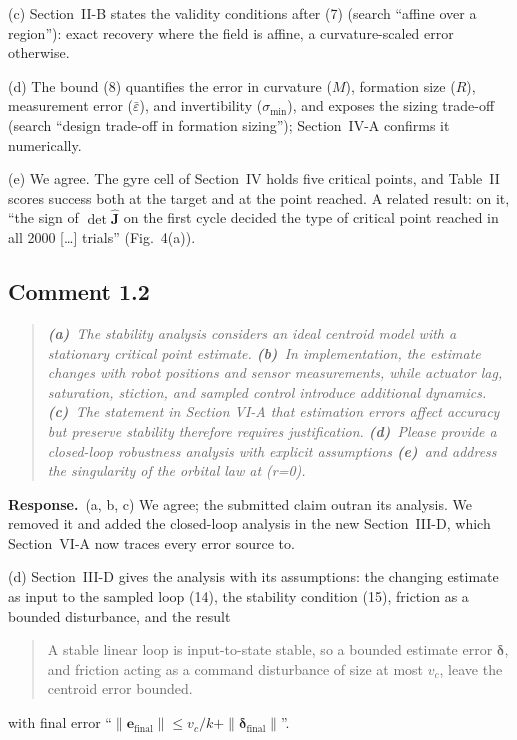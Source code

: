 \documentclass[10pt]{article}
\newcommand{\rev}[1]{#1}                             %
\newcommand{\resp}{\par\textbf{Response.}~}
\newenvironment{newtext}{\begin{quote}\small\sloppy}{\end{quote}}
\begin{document}
(c) Section~II-B states the validity conditions after (7) (search ``affine over a region''): exact recovery where the field is affine, a curvature-scaled error otherwise.

(d) The bound (8) quantifies the error in curvature ($M$), formation size ($R$), measurement error ($\bar\varepsilon$), and invertibility ($\sigma_{\min}$), and exposes the sizing trade-off (search ``design trade-off in formation sizing''); Section~IV-A confirms it numerically.

(e) We agree. The gyre cell of Section~IV holds five critical points, and Table~II scores success both at the target and at the point reached. A related result: on it, ``the sign of $\det\hat{\mathbf{J}}$ on the first cycle decided the type of critical point reached in all \rev{2000} [\ldots] trials'' (Fig.~4(a)).

\subsection*{Comment 1.2}

\begin{quote}\itshape
\textbf{(a)}~The stability analysis considers an ideal centroid model with a stationary critical point estimate.
\textbf{(b)}~In implementation, the estimate changes with robot positions and sensor measurements, while actuator lag, saturation, stiction, and sampled control introduce additional dynamics.
\textbf{(c)}~The statement in Section VI-A that estimation errors affect accuracy but preserve stability therefore requires justification.
\textbf{(d)}~Please provide a closed-loop robustness analysis with explicit assumptions
\textbf{(e)}~and address the singularity of the orbital law at (r=0).
\end{quote}

\resp (a, b, c) We agree; the submitted claim outran its analysis. We removed it and added the closed-loop analysis in the new Section~III-D, which Section~VI-A now traces every error source to.

(d) Section~III-D gives the analysis with its assumptions: the changing estimate as input to the sampled loop (14), the stability condition (15), friction as a bounded disturbance, and the result
\begin{newtext}
A stable linear loop is input-to-state stable, so a bounded estimate error $\boldsymbol{\delta}$, and friction acting as a command disturbance of size at most $v_c$, leave the centroid error bounded.
\end{newtext}
with final error ``$\|\mathbf{e}_{\text{final}}\| \le v_c/k + \|\boldsymbol{\delta}_{\text{final}}\|$''.
\end{document}
